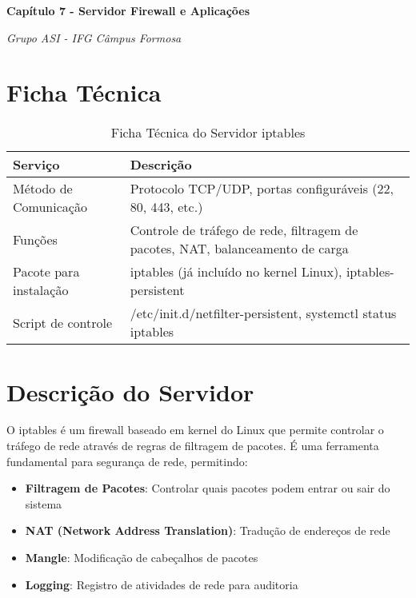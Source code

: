 \documentclass[12pt,fleqn]{article}
\begin{document}
\pagestyle{plain}
\setlength{\parindent}{0pt}
\setlength{\parskip}{6pt}  

\begin{center}
{\Large \textbf{Capítulo 7 - Servidor Firewall e Aplicações}}
\end{center}
\begin{center}
{\textit{Grupo ASI - IFG Câmpus Formosa}}
\end{center}

\section {Ficha Técnica}  

\begin{table}[h]
\centering
\begin{tabular}{|p{3cm}|p{10cm}|}
	\hline
	\textbf{Serviço} & \textbf{Descrição}\\\hline 
	Método de Comunicação & Protocolo TCP/UDP, portas configuráveis (22, 80, 443, etc.) \\\hline
	Funções & Controle de tráfego de rede, filtragem de pacotes, NAT, balanceamento de carga\\\hline
	Pacote para instalação & iptables (já incluído no kernel Linux), iptables-persistent\\\hline
	Script de controle & /etc/init.d/netfilter-persistent, systemctl status iptables\\\hline
\end{tabular}
\caption{Ficha Técnica do Servidor iptables}
\end{table}

\section{Descrição do Servidor}

O iptables é um firewall baseado em kernel do Linux que permite controlar o tráfego de rede através de regras de filtragem de pacotes. É uma ferramenta fundamental para segurança de rede, permitindo:

\begin{itemize}
    \item \textbf{Filtragem de Pacotes}: Controlar quais pacotes podem entrar ou sair do sistema
    \item \textbf{NAT (Network Address Translation)}: Tradução de endereços de rede
    \item \textbf{Mangle}: Modificação de cabeçalhos de pacotes
    \item \textbf{Logging}: Registro de atividades de rede para auditoria
\end{itemize}
\end{document}
